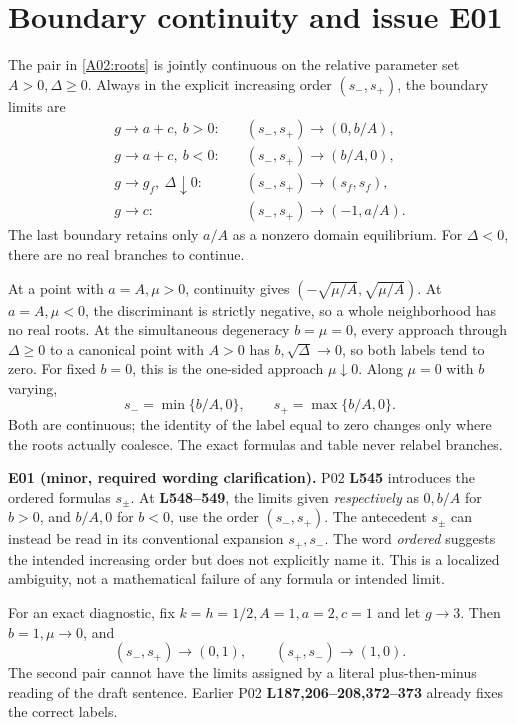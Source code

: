 \documentclass[11pt]{article}
\newcommand{\lin}[1]{\textbf{L#1}}
\begin{document}
\section{Boundary continuity and issue E01}

The pair in \eqref{A02:roots} is jointly continuous on the relative
parameter set \(A>0,\Delta\ge0\). Always in the explicit increasing
order \((s_-,s_+)\), the boundary limits are
\begin{align*}
g\to a+c,\ b>0:\quad &(s_-,s_+)\to(0,b/A),\\
g\to a+c,\ b<0:\quad &(s_-,s_+)\to(b/A,0),\\
g\to g_f,\ \Delta\downarrow0:\quad &(s_-,s_+)\to(s_f,s_f),\\
g\to c:\quad &(s_-,s_+)\to(-1,a/A).
\end{align*}
The last boundary retains only \(a/A\) as a nonzero domain equilibrium.
For \(\Delta<0\), there are no real branches to continue.

At a point with \(a=A,\mu>0\), continuity gives
\((-\sqrt{\mu/A},\sqrt{\mu/A})\). At \(a=A,\mu<0\), the
discriminant is strictly negative, so a whole neighborhood has no
real roots. At the simultaneous degeneracy \(b=\mu=0\), every
approach through \(\Delta\ge0\) to a canonical point with \(A>0\)
has \(b,\sqrt{\Delta}\to0\), so both labels tend to zero.
For fixed \(b=0\), this is the one-sided approach \(\mu\downarrow0\).
Along \(\mu=0\) with \(b\) varying,
\[
s_-=\min\{b/A,0\},\qquad s_+=\max\{b/A,0\}.
\]
Both are continuous; the identity of the label equal to zero changes
only where the roots actually coalesce. The exact formulas and table
never relabel branches.

\textbf{E01 (minor, required wording clarification).}
P02 \lin{545} introduces the ordered formulas \(s_\pm\).
At \lin{548--549}, the limits given \emph{respectively} as
\(0,b/A\) for \(b>0\), and \(b/A,0\) for \(b<0\), use the order
\((s_-,s_+)\). The antecedent \(s_\pm\) can instead be read in
its conventional expansion \(s_+,s_-\).
The word \emph{ordered} suggests the intended increasing order but
does not explicitly name it. This is a localized ambiguity, not
a mathematical failure of any formula or intended limit.

For an exact diagnostic, fix \(k=h=1/2,A=1,a=2,c=1\) and
let \(g\to3\). Then \(b=1,\mu\to0\), and
\[
(s_-,s_+)\to(0,1),\qquad (s_+,s_-)\to(1,0).
\]
The second pair cannot have the limits assigned by a literal
plus-then-minus reading of the draft sentence.
Earlier P02 \lin{187,206--208,372--373} already fixes the correct labels.
\end{document}
